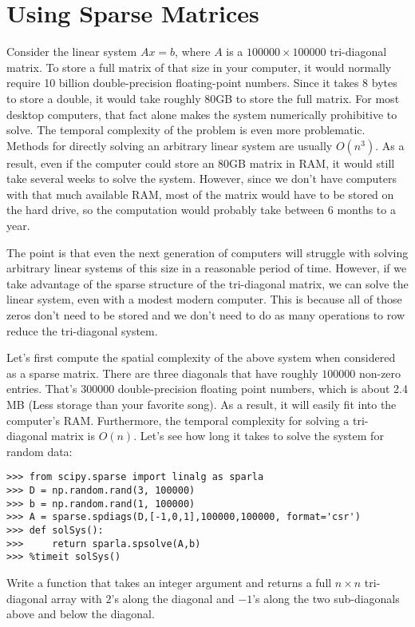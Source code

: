 \section*{Using Sparse Matrices}
Consider the linear system $A x = b$, where $A$ is a $100000\times 100000$ tri-diagonal matrix.
To store a full matrix of that size in your computer, it would normally require 10
billion double-precision floating-point numbers.  Since it takes 8
bytes to store a double, it would take roughly 80GB to store the
full matrix.  For most desktop computers, that fact alone makes the
system numerically prohibitive to solve.
The temporal complexity of the problem is even more problematic.
Methods for directly solving an arbitrary linear system are usually $O(n^3)$.
As a result, even if the computer could store an 80GB matrix in RAM, it
would still take several weeks to solve the system.  However, since
we don't have computers with that much available RAM, most of the
matrix would have to be stored on the hard drive, so the computation
would probably take between $6$ months to a year.

The point is that even the next generation of computers will
struggle with solving arbitrary linear systems of this size in a
reasonable period of time.  However, if we take advantage of the
sparse structure of the tri-diagonal matrix, we can solve the linear
system, even with a modest modern computer.  This is because all of
those zeros don't need to be stored and we don't need to do as many
operations to row reduce the tri-diagonal system.

Let's first compute the spatial complexity of the above system when
considered as a sparse matrix.  There are three diagonals that have
roughly $100000$ non-zero entries.  That's $300000$
double-precision floating point numbers, which is about 2.4 MB (Less
storage than your favorite song).  As a result, it will easily
fit into the computer's RAM.  Furthermore, the temporal complexity for solving
a tri-diagonal matrix is $O(n)$. Let's see how long it takes to
solve the system for random data:
\begin{lstlisting}
>>> from scipy.sparse import linalg as sparla
>>> D = np.random.rand(3, 100000)
>>> b = np.random.rand(1, 100000)
>>> A = sparse.spdiags(D,[-1,0,1],100000,100000, format='csr')
>>> def solSys():
>>>     return sparla.spsolve(A,b)
>>> %timeit solSys()
\end{lstlisting}

\begin{problem}
Write a function that takes an integer argument  and returns a full $n\times n$
tri-diagonal array with $2$'s along the diagonal and $-1$'s along
the two sub-diagonals above and below the diagonal.
\label{prob:full_tridiag}
\end{problem}

